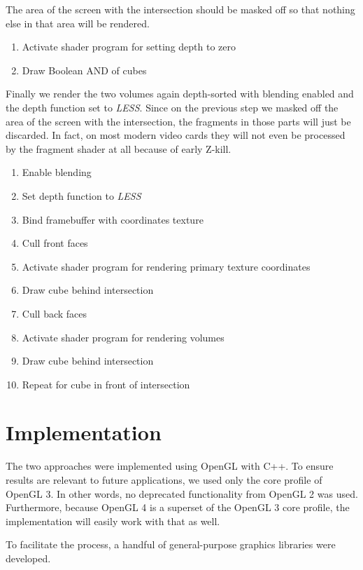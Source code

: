 \documentclass{report}
\begin{document}
The area of the screen with the intersection should be masked off so that
nothing else in that area will be rendered.

\begin{enumerate}
  \item Activate shader program for setting depth to zero
  \item Draw Boolean AND of cubes
\end{enumerate}

Finally we render the two volumes again depth-sorted with blending enabled and
the depth function set to \emph{LESS}.  Since on the previous step we masked off
the area of the screen with the intersection, the fragments in those parts will
just be discarded.  In fact, on most modern video cards they will not even be
processed by the fragment shader at all because of early Z-kill.

\begin{enumerate}
  \item Enable blending
  \item Set depth function to \emph{LESS}
  \item Bind framebuffer with coordinates texture
  \item Cull front faces
  \item Activate shader program for rendering primary texture coordinates
  \item Draw cube behind intersection
  \item Cull back faces
  \item Activate shader program for rendering volumes
  \item Draw cube behind intersection
  \item Repeat for cube in front of intersection
\end{enumerate}

\chapter{Implementation}

The two approaches were implemented using OpenGL with C++.  To ensure results
are relevant to future applications, we used only the core profile of OpenGL 3.
In other words, no deprecated functionality from OpenGL 2 was used.
Furthermore, because OpenGL 4 is a superset of the OpenGL 3 core profile, the
implementation will easily work with that as well.

To facilitate the process, a handful of general-purpose graphics libraries were
developed.
\end{document}
